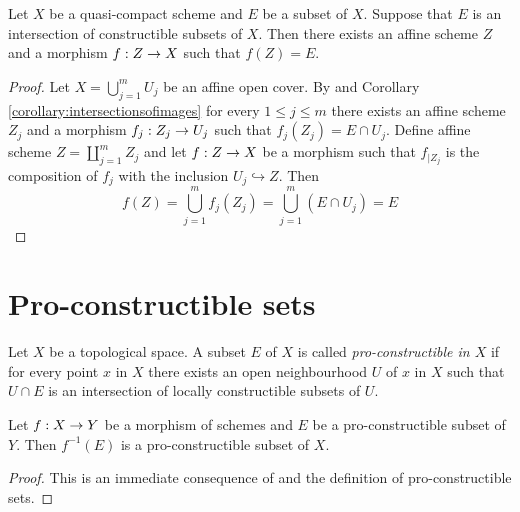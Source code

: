 \begin{corollary}\label{corollary:intersectionofconstructibleisimage}
Let $X$ be a quasi-compact scheme and $E$ be a subset of $X$. Suppose that $E$ is an intersection of constructible subsets of $X$. Then there exists an affine scheme $Z$ and a morphism $f:Z\rightarrow X$ such that $f(Z) = E$.
\end{corollary}
\begin{proof}
Let $X = \bigcup_{j=1}^mU_j$ be an affine open cover. By {\cite[Corollary 3.4]{Constructibleandlocallyconstructiblesets}} and Corollary \ref{corollary:intersectionsofimages} for every $1\leq j\leq m$ there exists an affine scheme $Z_j$ and a morphism $f_j:Z_j\rightarrow U_j$ such that $f_j(Z_j) = E\cap U_j$. Define affine scheme $Z = \coprod_{j=1}^m Z_j$ and let $f:Z\rightarrow X$ be a morphism such that $f_{\mid Z_j}$ is the composition of $f_j$ with the inclusion $U_j\hookrightarrow Z$. Then 
$$f(Z) = \bigcup_{j=1}^m f_j(Z_j) = \bigcup_{j=1}^m \left(E\cap U_j\right) = E$$
\end{proof}

\section{Pro-constructible sets}

\begin{definition}
Let $X$ be a topological space. A subset $E$ of $X$ is called  \textit{pro-constructible in $X$} if for every point $x$ in $X$ there exists an open neighbourhood $U$ of $x$ in $X$ such that $U\cap E$ is an intersection of locally constructible subsets of $U$.
\end{definition}

\begin{fact}\label{fact:proconstructiblepreimage}
Let $f:X\rightarrow Y$ be a morphism of schemes and $E$ be a pro-constructible subset of $Y$. Then $f^{-1}(E)$ is a pro-constructible subset of $X$.
\end{fact}
\begin{proof}
This is an immediate consequence of {\cite[Fact 3.5]{Constructibleandlocallyconstructiblesets}} and the definition of pro-constructible sets.
\end{proof}

